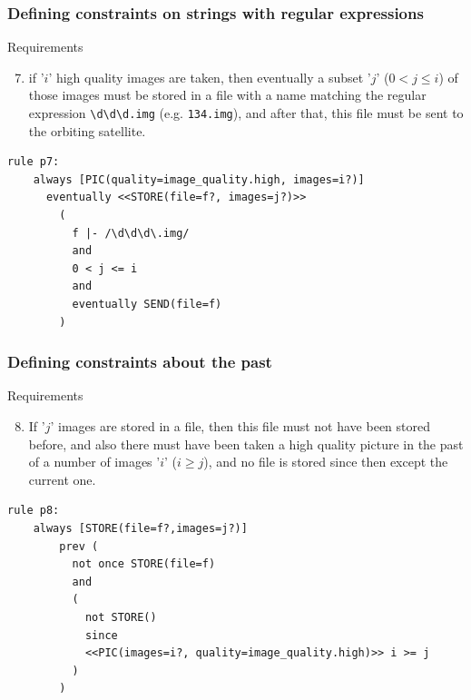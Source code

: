 \begin{frame}[fragile]
  \frametitle{Defining constraints on strings with regular expressions} \small

\begin{block}{Requirements}
\begin{enumerate}
\setcounter{enumi}{6}
\item  if '$i$' high quality images are taken, then eventually a subset '$j$' ($0 < j \le i$)
of those images must be stored in a file with a name matching the regular
expression \verb+\d\d\d.img+ (e.g. {\tt 134.img}), and after that, this file must be sent to
the orbiting satellite.
\end{enumerate}
\end{block}

\begin{lstlisting}[language=fuzzdsl,frame=single]
  rule p7: 
    always [PIC(quality=image_quality.high, images=i?)]
      eventually <<STORE(file=f?, images=j?)>>
        (
          f |- /\d\d\d\.img/ 
          and
          0 < j <= i 
          and
          eventually SEND(file=f)
        ) 
\end{lstlisting}

\end{frame}


\begin{frame}[fragile]
  \frametitle{Defining constraints about the past} \small

\begin{block}{Requirements}
\begin{enumerate}
\setcounter{enumi}{7}
\item If '$j$' images are stored in a file, then  
this file must not have been stored before, and also there must
have been taken a high quality picture in the past of a number of images '$i$'
($i \ge j$), and no file is stored since then except the current one.
\end{enumerate}
\end{block}

\begin{lstlisting}[language=fuzzdsl,frame=single]
  rule p8: 
    always [STORE(file=f?,images=j?)]
        prev ( 
          not once STORE(file=f) 
          and 
          (
            not STORE() 
            since 
            <<PIC(images=i?, quality=image_quality.high)>> i >= j
          )
        ) 
\end{lstlisting}

\end{frame}


